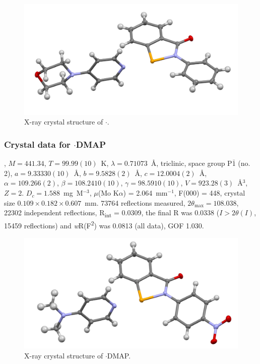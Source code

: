 \begin{refsection}
\begin{figure}
  \includegraphics[width=0.6\linewidth]{Figures/ebs-morph-xtal.pdf}
  \caption{X-ray crystal structure of \texorpdfstring{$ \cdot $}{C22 H21 N3 O2 Se}.}
\end{figure}

\subsubsection{Crystal data for \texorpdfstring{$ \cdot $DMAP}{C20 H18 N4 O3 Se}}
, $M=441.34$, $T=99.99(10)$~K, $ \lambda=0.71073 $~\AA, triclinic, space group P$\bar{1}$ (no. 2), $a = 9.33330(10)$~\AA, $b = 9.5828(2)$~\AA, $c = 12.0004(2)$~\AA, $\alpha = 109.266(2)$\degree, $\beta = 108.2410(10)$\degree, $\gamma = 98.5910(10)$\degree, $V = 923.28(3)$~\AA$^{3}$, $Z = 2$. $D_{c}= 1.588$~mg~M$^{-3}$, $\mu$(Mo K$\alpha$) = 2.064~mm$^{-1}$, F(000) = 448, crystal size $0.109 \times 0.182 \times 0.607$~mm. 73764 reflections measured, $2\theta_{\max}=108.038$\degree, 22302 independent reflections, R\textsubscript{int} = 0.0309, the final R was 0.0338 ($I > 2\theta(I)$, 15459 reflections) and \textit{w}R(F\textsuperscript{2}) was 0.0813 (all data), GOF 1.030.

\begin{figure}
  \includegraphics[width=0.6\linewidth]{Figures/ebs-4no2-dmap-xtal.pdf}
  \caption{X-ray crystal structure of \texorpdfstring{$ \cdot $DMAP}{C20 H18 N4 O3 Se}.}
\end{figure}


\end{refsection}
